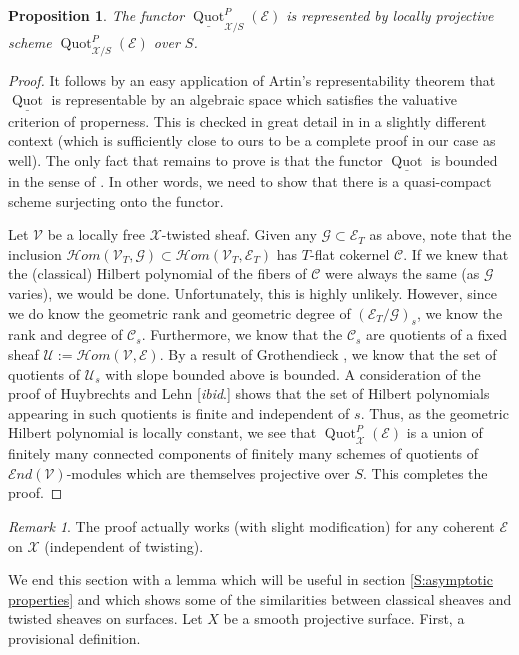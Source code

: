\documentclass[11pt]{amsart}
\newcommand{\ms}[1]{\mathscr #1}
\newcommand{\shom}{\ms H\!om}
\newcommand{\send}{\ms E\!nd}
\DeclareMathOperator{\quot}{Quot}
\renewcommand{\[}{[\!\hspace{0.03em}[}
\renewcommand{\]}{]\!\hspace{0.03em}]}
\renewcommand{\(}{(\!\hspace{0.03em}(}
\renewcommand{\)}{)\!\hspace{0.03em})}
\newtheorem{prop}[lem]{Proposition}
\theoremstyle{definition}
\theoremstyle{remark}
\newtheorem{remark}[lem]{Remark}
\newenvironment{rem}{\begin{remark}}{\nolinebreak{\hfill $\blacklozenge$} \end{remark}}
\begin{document}
\begin{prop}\label{P:quot proper} The functor $\underline{\quot}^{P}_{\ms X/S}(\ms E)$ is 
represented by locally projective scheme $\quot^{P}_{\ms X/S}(\ms 
E)$ over $S$.
\end{prop}
\begin{proof} It follows by an easy application of Artin's 
representability theorem 
that $\underline{\quot}$ is representable by an algebraic space which 
satisfies the valuative criterion of properness.  This is checked in 
great detail in \cite{olsson-starr} in a slightly different context (which 
is sufficiently close to ours to be a complete proof in our case as 
well).  The only fact that remains to prove is that the functor 
$\underline{\quot}$ is bounded in the sense of \cite[1.7.5]{h-l}.  In other 
words, we need to show that there is a quasi-compact scheme surjecting 
onto the functor.

Let $\ms V$ be a locally free $\ms X$-twisted sheaf.  Given any $\ms 
G\subset\ms E_{T}$ as above, note that the inclusion $\shom(\ms V_{T},\ms 
G)\subset\shom(\ms V_{T},\ms E_{T})$ has $T$-flat 
cokernel $\ms C$.  
If we knew that the (classical) Hilbert polynomial of the fibers of $\ms C$ were 
always the same (as $\ms G$ varies), we would be done.  Unfortunately, this is highly 
unlikely.  However, since we do know the geometric rank and geometric 
degree of $(\ms E_{T}/\ms G)_{s}$, we know the rank and degree of 
$\ms C_{s}$.  Furthermore, we know that the $\ms C_{s}$ are quotients 
of a fixed sheaf $\ms U:=\shom(\ms V,\ms E)$.  By a result of 
Grothendieck \cite[1.7.9]{h-l}, 
we know that the set of quotients of $\ms U_{s}$ with slope bounded above 
is bounded.  A consideration of the proof of Huybrechts 
and Lehn [\textit{ibid\/}.] shows that the set of Hilbert polynomials 
appearing in such quotients is finite and independent of $s$.  Thus, 
as the geometric Hilbert polynomial is locally constant, we see 
that $\quot^{P}_{\ms X}(\ms E)$ is a union of finitely many connected 
components of finitely many schemes of quotients of 
$\send(\ms V)$-modules which are themselves projective over $S$.  This 
completes the proof.
\end{proof}
\begin{rem} The proof actually works (with slight modification) 
for any coherent $\ms E$ on $\ms X$ (independent of twisting).
\end{rem}

We end this section with a lemma which will be useful in section 
\ref{S:asymptotic properties} and which shows some of the 
similarities between classical sheaves and twisted sheaves on surfaces.  Let $X$ be a smooth projective surface.  First, a provisional definition.
\end{document}
